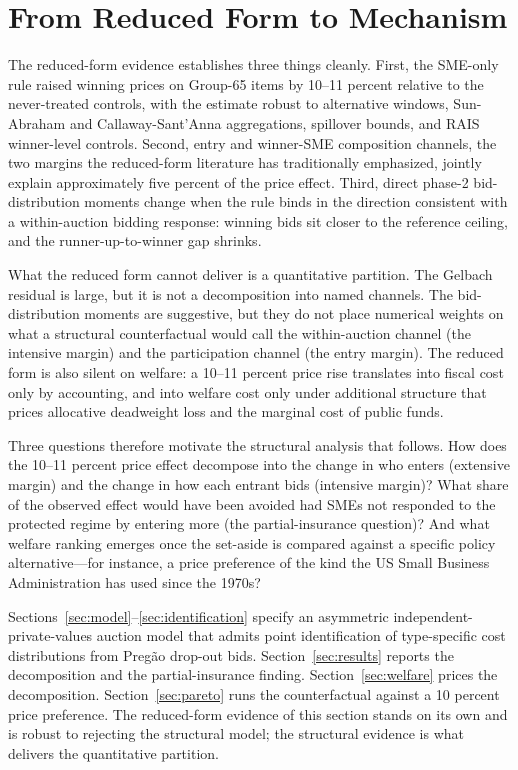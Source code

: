 \section{From Reduced Form to Mechanism}\label{sec:bridge}

The reduced-form evidence establishes three things cleanly. First, the SME-only rule raised winning prices on Group-65 items by 10--11 percent relative to the never-treated controls, with the estimate robust to alternative windows, Sun-Abraham and Callaway-Sant'Anna aggregations, spillover bounds, and RAIS winner-level controls. Second, entry and winner-SME composition channels, the two margins the reduced-form literature has traditionally emphasized, jointly explain approximately five percent of the price effect. Third, direct phase-2 bid-distribution moments change when the rule binds in the direction consistent with a within-auction bidding response: winning bids sit closer to the reference ceiling, and the runner-up-to-winner gap shrinks.

What the reduced form cannot deliver is a quantitative partition. The Gelbach residual is large, but it is not a decomposition into named channels. The bid-distribution moments are suggestive, but they do not place numerical weights on what a structural counterfactual would call the within-auction channel (the intensive margin) and the participation channel (the entry margin). The reduced form is also silent on welfare: a 10--11 percent price rise translates into fiscal cost only by accounting, and into welfare cost only under additional structure that prices allocative deadweight loss and the marginal cost of public funds.

Three questions therefore motivate the structural analysis that follows. How does the 10--11 percent price effect decompose into the change in who enters (extensive margin) and the change in how each entrant bids (intensive margin)? What share of the observed effect would have been avoided had SMEs not responded to the protected regime by entering more (the partial-insurance question)? And what welfare ranking emerges once the set-aside is compared against a specific policy alternative---for instance, a price preference of the kind the US Small Business Administration has used since the 1970s?

Sections~\ref{sec:model}--\ref{sec:identification} specify an asymmetric independent-private-values auction model that admits point identification of type-specific cost distributions from Preg\~ao drop-out bids. Section~\ref{sec:results} reports the decomposition and the partial-insurance finding. Section~\ref{sec:welfare} prices the decomposition. Section~\ref{sec:pareto} runs the counterfactual against a 10 percent price preference. The reduced-form evidence of this section stands on its own and is robust to rejecting the structural model; the structural evidence is what delivers the quantitative partition.
